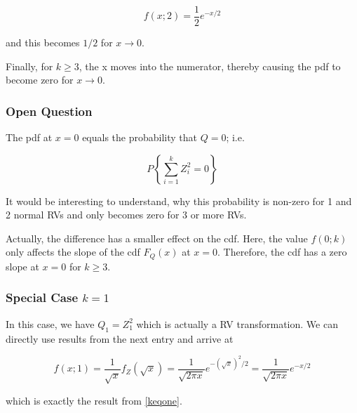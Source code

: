 \[
f(x;2) = \frac{1}{2} e^{-x/2}
\]

and this becomes \(1/2\) for \(x \rightarrow 0\).

Finally, for \(k \geq 3\), the x moves into the numerator, thereby
causing the pdf to become zero for \(x \rightarrow 0\).

\subsubsection{Open Question}

The pdf at \(x=0\) equals the probability that \(Q=0\); i.e.

\[
P\left\{\sum_{i=1}^k Z_i^2=0\right\}
\]

It would be interesting to understand, why this probability is non-zero for 1 and 2 normal RVs and only becomes zero for 3 or more RVs.

Actually, the difference has a smaller effect on the cdf. Here, the
value \(f(0;k)\) only affects the slope of the cdf \(F_Q(x)\) at
\(x=0\). Therefore, the cdf has a zero slope at \(x=0\) for
\(k \geq 3\).

\subsubsection{Special Case \(k=1\)}

In this case, we have \(Q_1 = Z_1^2\) which is actually a RV transformation. We can directly use results from the next entry and arrive at

\[
f(x;1) = \frac{1}{\sqrt{x}} f_Z(\sqrt{x}) = \frac{1}{\sqrt{2 \pi x}} e^{- (\sqrt{x})^2 / 2 } = \frac{1}{\sqrt{2 \pi x}} e^{- x / 2 }
\]

which is exactly the result from \eqref{keqone}.
